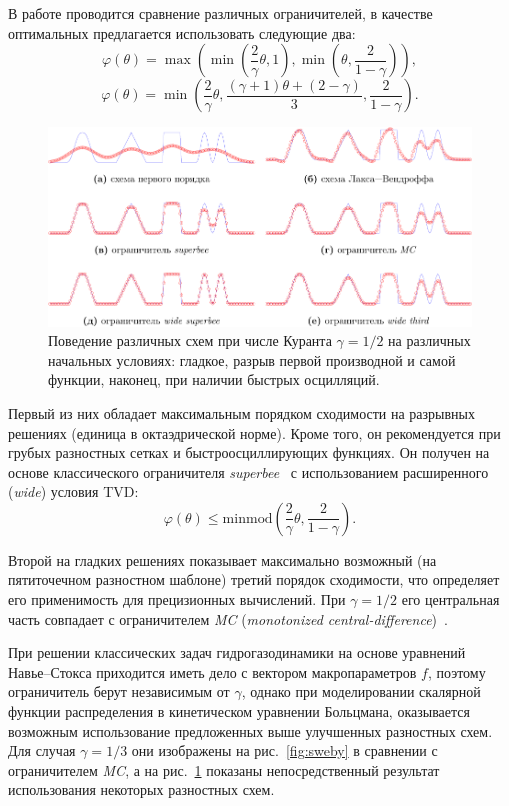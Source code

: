 \documentclass[a4paper,12pt]{article}
\begin{document}
В работе проводится сравнение различных ограничителей, в качестве оптимальных предлагается использовать следующие два:
\[ \varphi(\theta) = \max\left(\min\left(\dfrac2{\gamma}\theta,1\right),\min\left(\theta,\dfrac2{1-\gamma}\right)\right), \]
\[ \varphi(\theta) = \min\left(\dfrac2{\gamma}\theta,\dfrac{(\gamma+1)\theta+(2-\gamma)}{3},\dfrac2{1-\gamma}\right). \]

\begin{figure}
	\centering\includegraphics{limiters}
	\caption{Поведение различных схем при числе Куранта \(\gamma=1/2\) на различных начальных условиях:
		гладкое, разрыв первой производной и самой функции, наконец, при наличии быстрых осцилляций.}\label{fig:conver}
\end{figure}


Первый из них обладает максимальным порядком сходимости на разрывных решениях (единица в октаэдрической норме).
Кроме того, он рекомендуется при грубых разностных сетках и быстроосциллирующих функциях.
Он получен на основе классического ограничителя \textit{superbee}~\cite{Roe1985} с использованием расширенного (\textit{wide}) условия TVD:
\[\varphi(\theta) \leq \mathrm{minmod}\left(\frac2{\gamma}\theta,\frac2{1-\gamma}\right).\]

Второй на гладких решениях показывает максимально возможный (на пятиточечном разностном шаблоне) третий порядок сходимости,
что определяет его применимость для прецизионных вычислений.
При \(\gamma=1/2\) его центральная часть совпадает с ограничителем \textit{MC} (\textit{monotonized central-difference})~\cite{vanLeer1977}.

При решении классических задач гидрогазодинамики на основе уравнений Навье--Стокса приходится иметь дело с вектором макропараметров \(f\),
поэтому ограничитель берут независимым от \(\gamma\), однако при моделировании скалярной функции распределения
в кинетическом уравнении Больцмана, оказывается возможным использование предложенных выше улучшенных разностных схем.
Для случая \(\gamma=1/3\) они изображены на рис.~\ref{fig:sweby} в сравнении с ограничителем \textit{MC},
а на рис.~\ref{fig:conver} показаны непосредственный результат использования некоторых разностных схем.
\end{document}
